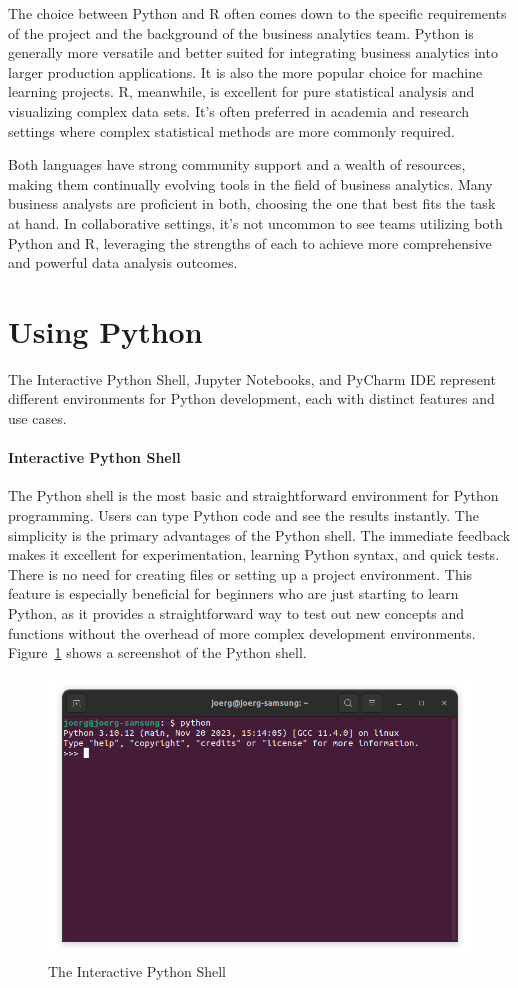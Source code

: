 The choice between Python and R often comes down to the specific requirements of the project and the background of the business analytics team. Python is generally more versatile and better suited for integrating business analytics into larger production applications. It is also the more popular choice for machine learning projects. R, meanwhile, is excellent for pure statistical analysis and visualizing complex data sets. It's often preferred in academia and research settings where complex statistical methods are more commonly required.

Both languages have strong community support and a wealth of resources, making them continually evolving tools in the field of business analytics. Many business analysts are proficient in both, choosing the one that best fits the task at hand. In collaborative settings, it's not uncommon to see teams utilizing both Python and R, leveraging the strengths of each to achieve more comprehensive and powerful data analysis outcomes.

\section{Using Python}

The Interactive Python Shell, Jupyter Notebooks, and PyCharm IDE represent different environments for Python development, each with distinct features and use cases.

\paragraph*{Interactive Python Shell} The Python shell is the most basic and straightforward environment for Python programming. Users can type Python code and see the results instantly. The simplicity is the primary advantages of the Python shell. The immediate feedback makes it excellent for experimentation, learning Python syntax, and quick tests. There is no need for creating files or setting up a project environment. This feature is especially beneficial for beginners who are just starting to learn Python, as it provides a straightforward way to test out new concepts and functions without the overhead of more complex development environments. Figure~\ref{fig:pythonshell} shows a screenshot of the Python shell.

\begin{figure}
\centering
\includegraphics[width=.75\textwidth]{screen3.png}
\caption{The Interactive Python Shell}
\label{fig:pythonshell}
\end{figure}

